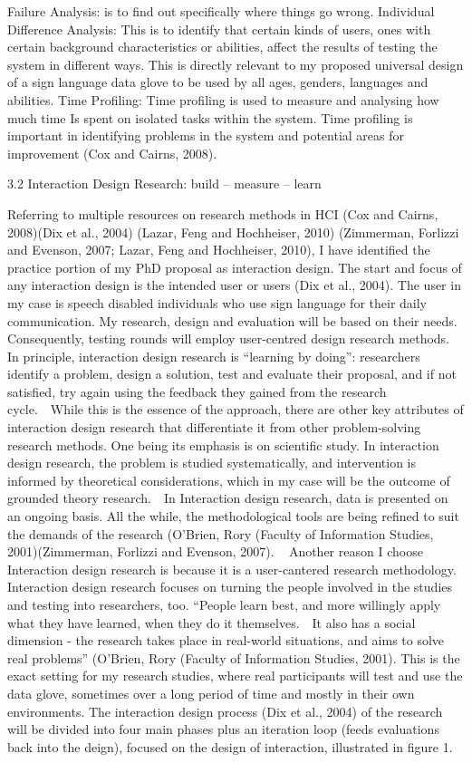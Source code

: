 Failure Analysis: is to find out specifically where things go wrong. 
Individual Difference Analysis:  This is to identify that certain kinds of users, ones with certain background characteristics or abilities, affect the results of testing the system in different ways.  This is directly relevant to my proposed universal design of a sign language data glove to be used by all ages, genders, languages and abilities. 
Time Profiling: Time profiling is used to measure and analysing how much time Is spent on isolated tasks within the system. Time profiling is important in identifying problems in the system and potential areas for improvement (Cox and Cairns, 2008). 

3.2 Interaction Design Research: build – measure – learn 

Referring to multiple resources on research methods in HCI (Cox and Cairns, 2008)(Dix et al., 2004) (Lazar, Feng and Hochheiser, 2010) (Zimmerman, Forlizzi and Evenson, 2007; Lazar, Feng and Hochheiser, 2010), I have identified the practice portion of my PhD proposal as interaction design. The start and focus of any interaction design is the intended user or users (Dix et al., 2004).  The user in my case is speech disabled individuals who use sign language for their daily communication.  My research, design and evaluation will be based on their needs. Consequently, testing rounds will employ user-centred design research methods.  
In principle, interaction design research is “learning by doing”: researchers identify a problem, design a solution, test and evaluate their proposal, and if not satisfied, try again using the feedback they gained from the research cycle.  While this is the essence of the approach, there are other key attributes of interaction design research that differentiate it from other problem-solving research methods. One being its emphasis is on scientific study. In interaction design research, the problem is studied systematically, and intervention is informed by theoretical considerations, which in my case will be the outcome of grounded theory research.  In Interaction design research, data is presented on an ongoing basis. All the while, the methodological tools are being refined to suit the demands of the research (O’Brien, Rory (Faculty of Information Studies, 2001)(Zimmerman, Forlizzi and Evenson, 2007). 
 
Another reason I choose Interaction design research is because it is a user-cantered research methodology. Interaction design research focuses on turning the people involved in the studies and testing into researchers, too.  “People learn best, and more willingly apply what they have learned, when they do it themselves.  It also has a social dimension - the research takes place in real-world situations, and aims to solve real problems” (O’Brien, Rory (Faculty of Information Studies, 2001). This is the exact setting for my research studies, where real participants will test and use the data glove, sometimes over a long period of time and mostly in their own environments.
The interaction design process (Dix et al., 2004) of the research will be divided into four main phases plus an iteration loop (feeds evaluations back into the deign), focused on the design of interaction, illustrated in figure 1.

